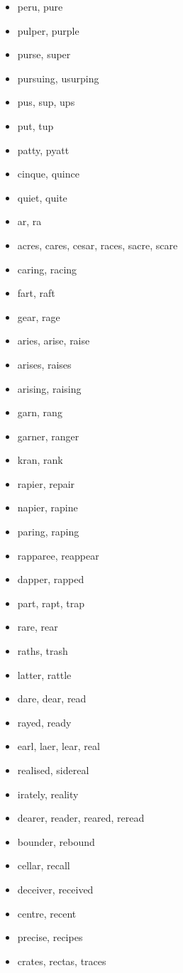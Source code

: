 \documentclass[a4wide,11pt]{report}
\begin{document}
\begin{itemize}
  \item peru, pure
  \item pulper, purple
  \item purse, super
  \item pursuing, usurping
  \item pus, sup, ups
  \item put, tup
  \item patty, pyatt
  \item cinque, quince
  \item quiet, quite
  \item ar, ra
  \item acres, cares, cesar, races, sacre, scare
  \item caring, racing
  \item fart, raft
  \item gear, rage
  \item aries, arise, raise
  \item arises, raises
  \item arising, raising
  \item garn, rang
  \item garner, ranger
  \item kran, rank
  \item rapier, repair
  \item napier, rapine
  \item paring, raping
  \item rapparee, reappear
  \item dapper, rapped
  \item part, rapt, trap
  \item rare, rear
  \item raths, trash
  \item latter, rattle
  \item dare, dear, read
  \item rayed, ready
  \item earl, laer, lear, real
  \item realised, sidereal
  \item irately, reality
  \item dearer, reader, reared, reread
  \item bounder, rebound
  \item cellar, recall
  \item deceiver, received
  \item centre, recent
  \item precise, recipes
  \item crates, rectas, traces

\end{itemize}
\end{document}
